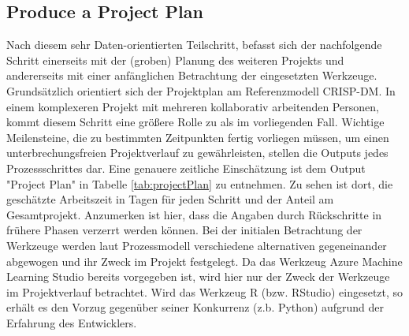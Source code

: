 \subsection{Produce a Project Plan}
Nach diesem sehr Daten-orientierten Teilschritt, befasst sich der nachfolgende Schritt einerseits mit der (groben) Planung des weiteren Projekts und andererseits mit einer anfänglichen Betrachtung der eingesetzten Werkzeuge. Grundsätzlich orientiert sich der Projektplan am Referenzmodell CRISP-DM. In einem komplexeren Projekt mit mehreren kollaborativ arbeitenden Personen, kommt diesem Schritt eine größere Rolle zu als im vorliegenden Fall. Wichtige Meilensteine, die zu bestimmten Zeitpunkten fertig vorliegen müssen, um einen unterbrechungsfreien Projektverlauf zu gewährleisten, stellen die Outputs jedes Prozessschrittes dar. Eine genauere zeitliche Einschätzung ist dem Output "Project Plan" in Tabelle \ref{tab:projectPlan} zu entnehmen. Zu sehen ist dort, die geschätzte Arbeitszeit in Tagen für jeden Schritt und der Anteil am Gesamtprojekt. Anzumerken ist hier, dass die Angaben durch Rückschritte in frühere Phasen verzerrt werden können.\newline
Bei der initialen Betrachtung der Werkzeuge werden laut Prozessmodell verschiedene alternativen gegeneinander abgewogen und ihr Zweck im Projekt festgelegt. Da das Werkzeug Azure Machine Learning Studio bereits vorgegeben ist, wird hier nur der Zweck der Werkzeuge im Projektverlauf betrachtet. Wird das Werkzeug R (bzw. RStudio) eingesetzt, so erhält es den Vorzug gegenüber seiner Konkurrenz (z.b. Python) aufgrund der Erfahrung des Entwicklers.


